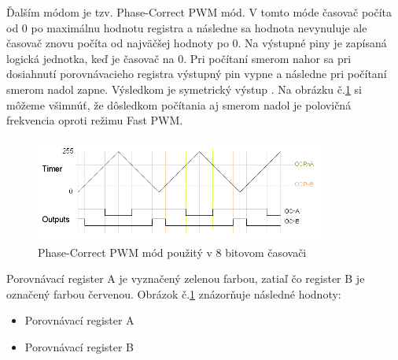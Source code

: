 \noindent \par
Ďalším módom je tzv. Phase-Correct PWM mód. V tomto móde časovač počíta od 0 po maximálnu hodnotu registra a následne sa hodnota nevynuluje
ale časovač znovu počíta od najväčšej hodnoty po 0. Na výstupné piny je zapísaná logická jednotka, keď je časovač na 0. Pri počítaní smerom nahor sa pri dosiahnutí porovnávacieho registra výstupný pin vypne
a následne pri počítaní smerom nadol zapne. Výsledkom je symetrický výstup \cite{shirriffSecretsArduinoPWM}. Na obrázku  č.\ref{figure:phase-correct-pwm-mode} si môžeme všimnúť,
že dôsledkom počítania aj smerom nadol je polovičná frekvencia oproti režimu Fast PWM.

\begin{figure}[!h]
    \centering
    \includegraphics[width=0.85\textwidth]{img/phase-correct.png}
    \caption{Phase-Correct PWM mód použitý v 8 bitovom časovači}
    \label{figure:phase-correct-pwm-mode}
\end{figure}

Porovnávací register A je vyznačený zelenou farbou, zatiaľ čo register B je označený farbou červenou. Obrázok č.\ref{figure:phase-correct-pwm-mode} znázorňuje následné hodnoty:
\begin{itemize}
    \item Porovnávací register A
    \item Porovnávací register B
\end{itemize}